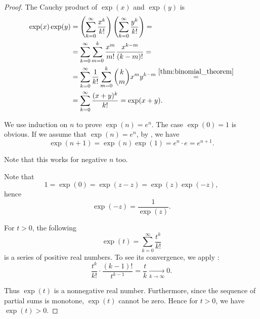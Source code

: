 \begin{proof}
   The Cauchy product of \( \exp(x) \) and \( \exp(y) \) is
  \begin{align*}
    \exp(x) \exp(y)
    &=
    \left( \sum_{k=0}^\infty \frac {x^k} {k!} \right) \left( \sum_{k=0}^\infty \frac {y^k} {k!} \right)
    = \\ &=
    \sum_{k=0}^\infty \sum_{m=0}^k \frac {x^m} {m!} \frac {x^{k-m}} {(k-m)!}
    = \\ &=
    \sum_{k=0}^\infty \frac 1 {k!} \sum_{m=0}^k \binom{k}{m} x^m y^{k-m}
    \overset {\ref{thm:binomial_theorem}} = \\ &=
    \sum_{k=0}^\infty \frac {(x + y)^k} {k!}
    =
    \exp(x + y).
  \end{align*}

   We use induction on \( n \) to prove \( \exp(n) = e^n \). The case \( \exp(0) = 1 \) is obvious. If we assume that \( \exp(n) = e^n \), by , we have
  \begin{equation*}
    \exp(n + 1)
    =
    \exp(n) \exp(1)
    =
    e^n \cdot e
    =
    e^{n+1}.
  \end{equation*}

  Note that this works for negative \( n \) too.

   Note that
  \begin{equation*}
    1 = \exp(0) = \exp(z - z) = \exp(z) \exp(-z),
  \end{equation*}
  hence
  \begin{equation*}
    \exp(-z) = \frac 1 {\exp(z)}.
  \end{equation*}

   For \( t > 0 \), the following
  \begin{equation*}
    \exp(t) = \sum_{k=0}^\infty \frac {t^k} {k!}
  \end{equation*}
  is a series of positive real numbers. To see its convergence, we apply :
  \begin{equation*}
    \frac {t^k} {k!} \cdot \frac {(k-1)!} {t^{k-1}}
    =
    \frac t k
    \xrightarrow[k \to \infty]{} 0.
  \end{equation*}

  Thus \( \exp(t) \) is a nonnegative real number. Furthermore, since the sequence of partial sums is monotone, \( \exp(t) \) cannot be zero. Hence for \( t > 0 \), we have \( \exp(t) > 0 \).


\end{proof}
